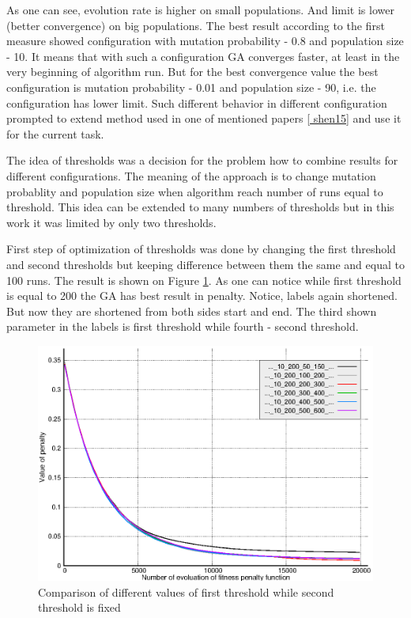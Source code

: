 \documentclass[12pt]{report}
\begin{document}
As one can see, evolution rate is higher on small populations. And limit is lower (better convergence) on big populations. The best result according to the first measure showed configuration with mutation probability - 0.8 and population size - 10. It means that with such a configuration GA converges faster, at least in the very beginning of algorithm run. But for the best convergence value the best configuration is mutation probability - 0.01 and population size - 90, i.e. the configuration has lower limit. Such different behavior in different configuration prompted to extend method used in one of mentioned papers \ref{
shen15} and use it for the current task.

The idea of thresholds was a decision for the problem how to combine results for different configurations. The meaning of the approach is to change mutation probablity and population size when algorithm reach number of runs equal to threshold. This idea can be extended to many numbers of thresholds but in this work it was limited by only two thresholds.

First step of optimization of thresholds was done by changing the first threshold and second thresholds but keeping difference between them the same and equal to 100 runs. The result is shown on Figure \ref{threshold1comparison}. As one can notice while first threshold is equal to 200 the GA has best result in penalty. Notice, labels again shortened. But now they are shortened from both sides start and end. The third shown parameter in the labels is first threshold while fourth - second threshold.

\begin{figure}
    \centering
    \includegraphics[width=5.0in]{threshold1_comparison}
    \caption{Comparison of different values of first threshold while second threshold is fixed}
    \label{threshold1comparison}
\end{figure}
\end{document}
